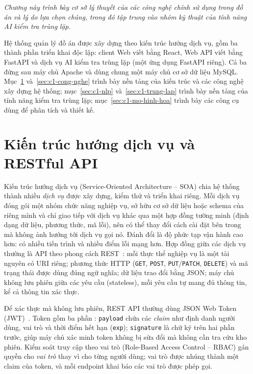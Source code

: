 \documentclass[../main.tex]{subfiles}
\begin{document}
\textit{Chương này trình bày cơ sở lý thuyết của các công nghệ chính sử dụng trong đồ án và lý do lựa chọn chúng, trong đó tập trung vào nhóm kỹ thuật của tính năng AI kiểm tra trùng lặp.}

Hệ thống quản lý đồ án được xây dựng theo kiến trúc hướng dịch vụ, gồm ba thành phần triển khai độc lập: client Web viết bằng React, Web API viết bằng FastAPI và dịch vụ AI kiểm tra trùng lặp (một ứng dụng FastAPI riêng). Cả ba đứng sau máy chủ Apache và dùng chung một máy chủ cơ sở dữ liệu MySQL. Mục~\ref{sec:c1-soa} và~\ref{sec:c1-cong-nghe} trình bày nền tảng của kiến trúc và các công nghệ xây dựng hệ thống; mục~\ref{sec:c1-nlp} và~\ref{sec:c1-trung-lap} trình bày nền tảng của tính năng kiểm tra trùng lặp; mục~\ref{sec:c1-mo-hinh-hoa} trình bày các công cụ dùng để phân tích và thiết kế.

\section{Kiến trúc hướng dịch vụ và RESTful API}\label{sec:c1-soa}

Kiến trúc hướng dịch vụ (Service-Oriented Architecture -- SOA) chia hệ thống thành nhiều \textit{dịch vụ} được xây dựng, kiểm thử và triển khai riêng. Mỗi dịch vụ đóng gói một nhóm chức năng nghiệp vụ, sở hữu cơ sở dữ liệu hoặc schema của riêng mình và chỉ giao tiếp với dịch vụ khác qua một hợp đồng tường minh (định dạng dữ liệu, phương thức, mã lỗi), nên có thể thay đổi cách cài đặt bên trong mà không ảnh hưởng tới dịch vụ gọi nó. Đánh đổi là độ phức tạp vận hành cao hơn: có nhiều tiến trình và nhiều điểm lỗi mạng hơn. Hợp đồng giữa các dịch vụ thường là API theo phong cách REST~\cite{fielding2000rest}: mỗi thực thể nghiệp vụ là một tài nguyên có URI riêng; phương thức HTTP (\texttt{GET}, \texttt{POST}, \texttt{PUT}/\texttt{PATCH}, \texttt{DELETE}) và mã trạng thái được dùng đúng ngữ nghĩa; dữ liệu trao đổi bằng JSON; máy chủ không lưu phiên giữa các yêu cầu (stateless), mỗi yêu cầu tự mang đủ thông tin, kể cả thông tin xác thực.

Để xác thực mà không lưu phiên, REST API thường dùng JSON Web Token (JWT)~\cite{rfc7519}. Token gồm ba phần : \texttt{payload} chứa các \textit{claim} như định danh người dùng, vai trò và thời điểm hết hạn (\texttt{exp}); \texttt{signature} là chữ ký trên hai phần trước, giúp máy chủ xác minh token không bị sửa đổi mà không cần tra cứu kho phiên. Kiểm soát truy cập theo vai trò (Role-Based Access Control -- RBAC) gán quyền cho \textit{vai trò} thay vì cho từng người dùng; vai trò được nhúng thành một claim của token, và mỗi endpoint khai báo các vai trò được phép gọi.
\end{document}
